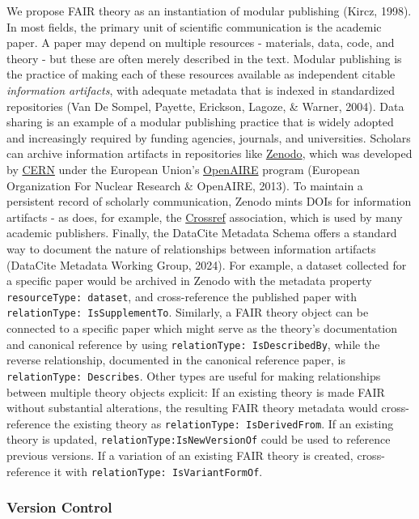 \documentclass[
  man, noextraspace,floatsintext]{apa6}
\begin{document}
We propose FAIR theory as an instantiation of modular publishing (Kircz, 1998).
In most fields, the primary unit of scientific communication is the academic paper.
A paper may depend on multiple resources - materials, data, code, and theory - but these are often merely described in the text.
Modular publishing is the practice of making each of these resources available as independent citable \emph{information artifacts},
with adequate metadata that is indexed in standardized repositories (Van De Sompel, Payette, Erickson, Lagoze, \& Warner, 2004).
Data sharing is an example of a modular publishing practice that is widely adopted and increasingly required by funding agencies, journals, and universities.
Scholars can archive information artifacts in repositories like \href{https://zenodo.org/}{Zenodo},
which was developed by \href{https://home.cern/}{CERN} under the European Union's \href{https://www.openaire.eu/}{OpenAIRE} program (European Organization For Nuclear Research \& OpenAIRE, 2013).
To maintain a persistent record of scholarly communication,
Zenodo mints DOIs for information artifacts - as does, for example, the \href{https://www.crossref.org/}{Crossref} association,
which is used by many academic publishers.
Finally, the DataCite Metadata Schema offers a standard way to document the nature of relationships between information artifacts (DataCite Metadata Working Group, 2024).
For example, a dataset collected for a specific paper would be archived in Zenodo with the metadata property \texttt{resourceType:\ dataset},
and cross-reference the published paper with \texttt{relationType:\ IsSupplementTo}.
Similarly, a FAIR theory object can be connected to a specific paper which might serve as the theory's documentation and canonical reference by using \texttt{relationType:\ IsDescribedBy}, while the reverse relationship, documented in the canonical reference paper, is \texttt{relationType:\ Describes}. Other types are useful for making relationships between multiple theory objects explicit: If an existing theory is made FAIR without substantial alterations,
the resulting FAIR theory metadata would cross-reference the existing theory as \texttt{relationType:\ IsDerivedFrom}.
If an existing theory is updated, \texttt{relationType:IsNewVersionOf} could be used to reference previous versions.
If a variation of an existing FAIR theory is created, cross-reference it with \texttt{relationType:\ IsVariantFormOf}.

\subsubsection{Version Control}\label{version-control}
\end{document}
